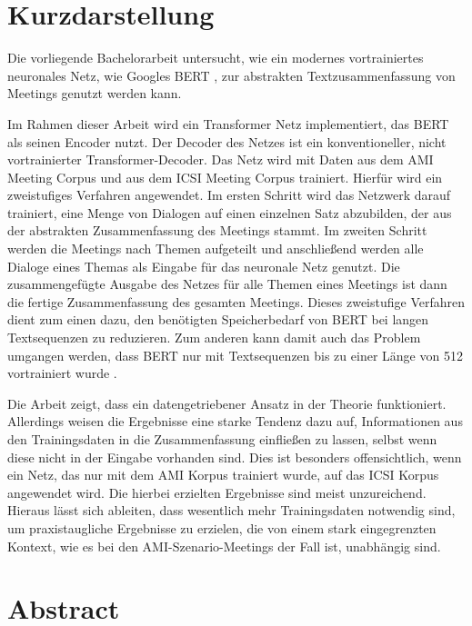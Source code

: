 \thispagestyle{empty}
\section*{Kurzdarstellung}
\label{sec:kurzdarstellung}

Die vorliegende Bachelorarbeit untersucht, wie ein modernes vortrainiertes neuronales Netz, wie \zB Googles BERT \cite{devlin2018bert}, zur abstrakten Textzusammenfassung von Meetings genutzt werden kann.

Im Rahmen dieser Arbeit wird ein Transformer Netz \cite{1706.03762} implementiert, das BERT als seinen Encoder nutzt.
Der Decoder des Netzes ist ein konventioneller, nicht vortrainierter Transformer-Decoder.
Das Netz wird mit Daten aus dem AMI Meeting Corpus \cite{Mccowan05theami} und aus dem ICSI Meeting Corpus \cite{Janin} trainiert.
Hierfür wird ein zweistufiges Verfahren angewendet.
Im ersten Schritt wird das Netzwerk darauf trainiert, eine Menge von Dialogen auf einen einzelnen Satz abzubilden, der aus der abstrakten Zusammenfassung des Meetings stammt.
Im zweiten Schritt werden die Meetings nach Themen aufgeteilt und anschließend werden alle Dialoge eines Themas als Eingabe für das neuronale Netz genutzt.
Die zusammengefügte Ausgabe des Netzes für alle Themen eines Meetings ist dann die fertige Zusammenfassung des gesamten Meetings.
Dieses zweistufige Verfahren dient zum einen dazu, den benötigten Speicherbedarf von BERT bei langen Textsequenzen zu reduzieren.
Zum anderen kann damit auch das Problem umgangen werden, dass BERT nur mit Textsequenzen bis zu einer Länge von 512 vortrainiert wurde \cite[p.~13]{devlin2018bert}.

Die Arbeit zeigt, dass ein datengetriebener Ansatz in der Theorie funktioniert.
Allerdings weisen die Ergebnisse eine starke Tendenz dazu auf, Informationen aus den Trainingsdaten in die Zusammenfassung einfließen zu lassen, selbst wenn diese nicht in der Eingabe vorhanden sind.
Dies ist besonders offensichtlich, wenn ein Netz, das nur mit dem AMI Korpus trainiert wurde, auf das ICSI Korpus angewendet wird.
Die hierbei erzielten Ergebnisse sind meist unzureichend.
Hieraus lässt sich ableiten, dass wesentlich mehr Trainingsdaten notwendig sind, um praxistaugliche Ergebnisse zu erzielen, die von einem stark eingegrenzten Kontext, wie es bei den AMI-Szenario-Meetings der Fall ist, unabhängig sind.

\section*{Abstract}
\label{sec:abstract}

